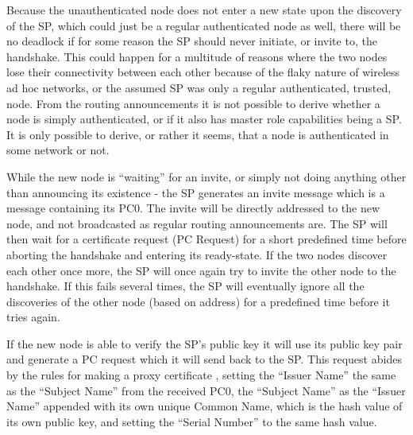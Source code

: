 Because the unauthenticated node does not enter a new state upon the discovery
of the \ac{SP}, which could just be a regular authenticated node as well, there
will be no deadlock if for some reason the \ac{SP} should never initiate, or
invite to, the handshake. This could happen for a multitude of reasons where
the two nodes lose their connectivity between each other because of the flaky
nature of wireless ad hoc networks, or the assumed \ac{SP} was only a regular
authenticated, trusted, node. From the routing announcements it is not possible
to derive whether a node is simply authenticated, or if it also has master role
capabilities being a \ac{SP}. It is only possible to derive, or rather it seems,
that a node is authenticated in some network or not.


While the new node is ``waiting'' for an invite, or simply not doing anything
other than announcing its existence - the \ac{SP} generates an invite message
which is a message containing its \ac{PC0}. The invite will be directly
addressed to the new node, and not broadcasted as regular routing announcements
are. The \ac{SP} will then wait for a certificate request (\ac{PC} Request) for
a short predefined time before aborting the handshake and entering its
ready-state. If the two nodes discover each other once more, the \ac{SP} will
once again try to invite the other node to the handshake. If this fails several
times, the \ac{SP} will eventually ignore all the discoveries of the other node
(based on address) for a predefined time before it tries again.

If the new node is able to verify the SP's public key it will use its public
key pair and generate a \ac{PC} request which it will send back to the \ac{SP}.
This request abides by the rules for making a proxy certificate \cite{rfc3820},
setting the ``Issuer Name'' the same as the ``Subject Name'' from the received
\ac{PC0}, the ``Subject Name'' as the ``Issuer Name'' appended with its own
unique Common Name, which is the hash value of its own public key, and setting
the ``Serial Number'' to the same hash value.

